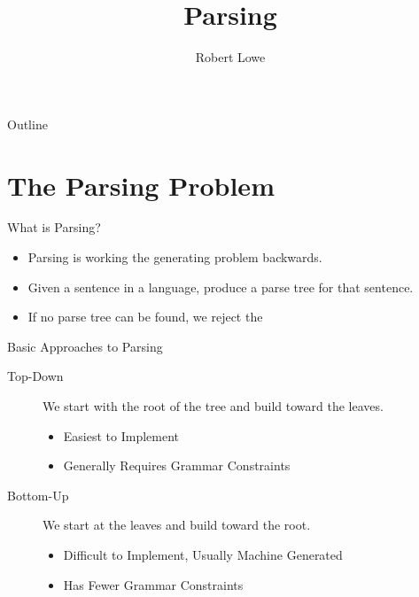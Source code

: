 \documentclass[handout]{beamer}
\title{Parsing}
\author{Robert Lowe}
\institute[Southeast Missouri State University] %
{
  Department of Computer Science\\
  Southeast Missouri State University
}
\date[]{}
\begin{document}
\begin{frame}
  \titlepage
\end{frame}

\begin{frame}{Outline}
  \tableofcontents
\end{frame}




\section{The Parsing Problem}
\begin{frame}{What is Parsing?}
    \begin{itemize}
        \item Parsing is working the generating problem backwards.
        \item Given a sentence in a language, produce a parse tree for that sentence.
        \item If no parse tree can be found, we reject the 
    \end{itemize}
\end{frame}

\begin{frame}{Basic Approaches to Parsing}
    \begin{description}
        \item[Top-Down] We start with the root of the tree and build toward the leaves.
        \begin{itemize}
            \item Easiest to Implement
            \item Generally Requires Grammar Constraints
        \end{itemize}
        \item[Bottom-Up] We start at the leaves and build toward the root.
        \begin{itemize}
            \item Difficult to Implement, Usually Machine Generated
            \item Has Fewer Grammar Constraints
        \end{itemize}
    \end{description}
\end{frame}
\end{document}
